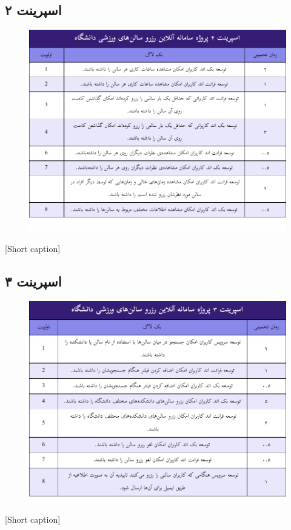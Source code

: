 \subsection{
اسپرینت ۲
}
\begin{center}
  \begin{figure} [H]
    { \includegraphics[page=1, width=\textwidth]{appandecies/sprint_2.pdf}}
  \end{figure}
  [Short caption]{}
\end{center}

\subsection{
اسپرینت ۳
}
\begin{center}
  \begin{figure} [H]
    { \includegraphics[page=1, width=\textwidth]{appandecies/sprint_3.pdf}}
  \end{figure}
  [Short caption]{}
\end{center}

